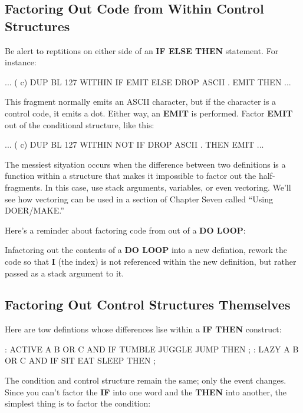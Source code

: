 \subsection{{Factoring Out Code from Within Control Structures}}

Be alert to reptitions on either side of an \textbf{IF ELSE THEN} statement. For instance:

\begin{Code}
... ( c)  DUP  BL 127 WITHIN
       IF  EMIT  ELSE
       DROP  ASCII . EMIT   THEN ...
\end{Code}
This fragment normally emits an ASCII character, but if the character is a control code, it emits a dot. Either way, an \textbf{EMIT} is performed. Factor \textbf{EMIT} out of the conditional structure, like this:

\begin{Code}
... ( c)  DUP  BL 127 WITHIN NOT
       IF  DROP  ASCII .  THEN  EMIT  ...
\end{Code}
The messiest sityation occurs when the difference between two definitions is a function within a structure that makes it impossible to factor out the half-fragments. In this case, use stack arguments, variables, or even vectoring. We'll see how vectoring can be used in a section of Chapter Seven called ``Using DOER/MAKE.''

Here's a reminder about factoring code from out of a \textbf{DO LOOP}:

\begin{tip}
Infactoring out the contents of a \textbf{DO LOOP} into a new defintion, rework the code so that \textbf{I} (the index) is not referenced within the new definition, but rather passed as a stack argument to it.
\end{tip}

\subsection{{Factoring Out Control Structures Themselves}}

Here are tow defintions whose differences lise within a \textbf{IF THEN} construct:

\begin{Code}
: ACTIVE    A B OR  C AND  IF  TUMBLE JUGGLE JUMP THEN ;
: LAZY      A B OR  C AND  IF   SIT  EAT  SLEEP   THEN ;
\end{Code}
The condition and control structure remain the same; only the event changes. Since you can't factor the \textbf{IF} into one word and the \textbf{THEN} into another, the simplest thing is to factor the condition:

